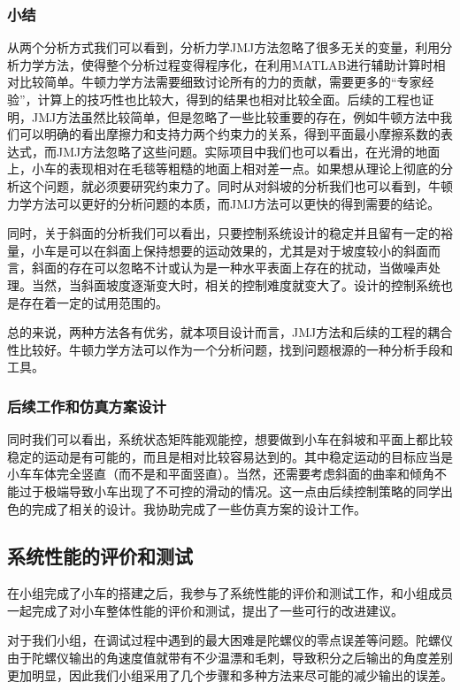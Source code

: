 \documentclass[UTF8,a4paper]{paper}
\begin{document}
\subsubsection{小结}
从两个分析方式我们可以看到，分析力学JMJ方法忽略了很多无关的变量，利用分析力学方法，使得整个分析过程变得程序化，在利用MATLAB进行辅助计算时相对比较简单。牛顿力学方法需要细致讨论所有的力的贡献，需要更多的“专家经验”，计算上的技巧性也比较大，得到的结果也相对比较全面。后续的工程也证明，JMJ方法虽然比较简单，但是忽略了一些比较重要的存在，例如牛顿方法中我们可以明确的看出摩擦力和支持力两个约束力的关系，得到平面最小摩擦系数的表达式，而JMJ方法忽略了这些问题。实际项目中我们也可以看出，在光滑的地面上，小车的表现相对在毛毯等粗糙的地面上相对差一点。如果想从理论上彻底的分析这个问题，就必须要研究约束力了。同时从对斜坡的分析我们也可以看到，牛顿力学方法可以更好的分析问题的本质，而JMJ方法可以更快的得到需要的结论。

同时，关于斜面的分析我们可以看出，只要控制系统设计的稳定并且留有一定的裕量，小车是可以在斜面上保持想要的运动效果的，尤其是对于坡度较小的斜面而言，斜面的存在可以忽略不计或认为是一种水平表面上存在的扰动，当做噪声处理。当然，当斜面坡度逐渐变大时，相关的控制难度就变大了。设计的控制系统也是存在着一定的试用范围的。

总的来说，两种方法各有优劣，就本项目设计而言，JMJ方法和后续的工程的耦合性比较好。牛顿力学方法可以作为一个分析问题，找到问题根源的一种分析手段和工具。
\subsubsection{后续工作和仿真方案设计}
同时我们可以看出，系统状态矩阵能观能控，想要做到小车在斜坡和平面上都比较稳定的运动是有可能的，而且是相对比较容易达到的。其中稳定运动的目标应当是小车车体完全竖直（而不是和平面竖直）。当然，还需要考虑斜面的曲率和倾角不能过于极端导致小车出现了不可控的滑动的情况。这一点由后续控制策略的同学出色的完成了相关的设计。我协助完成了一些仿真方案的设计工作。

\subsection{系统性能的评价和测试}
在小组完成了小车的搭建之后，我参与了系统性能的评价和测试工作，和小组成员一起完成了对小车整体性能的评价和测试，提出了一些可行的改进建议。

对于我们小组，在调试过程中遇到的最大困难是陀螺仪的零点误差等问题。陀螺仪由于陀螺仪输出的角速度值就带有不少温漂和毛刺，导致积分之后输出的角度差别更加明显，因此我们小组采用了几个步骤和多种方法来尽可能的减少输出的误差。
\end{document}

